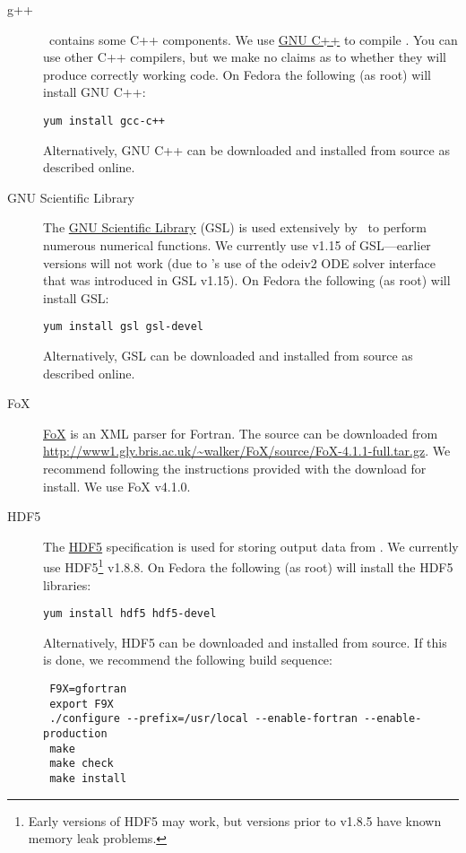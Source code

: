 \begin{description}
\item [g++] \glc\ contains some C++ components. We use \href{http://gcc.gnu.org/projects/cxx0x.html}{GNU C++} to compile \glc. You can use other C++ compilers, but we make no claims as to whether they will produce correctly working code. On Fedora the following (as root) will install GNU C++:
\begin{verbatim}
yum install gcc-c++
\end{verbatim}
Alternatively, GNU C++ can be downloaded and installed from source as described online.

\item [GNU Scientific Library] The \href{http://www.gnu.org/software/gsl/}{GNU Scientific Library} (GSL) is used extensively by \glc\ to perform numerous numerical functions. We currently use v1.15 of GSL---earlier versions will not work (due to \glc's use of the {\normalfont \ttfamily odeiv2} ODE solver interface that was introduced in GSL v1.15). On Fedora the following (as root) will install GSL:
\begin{verbatim}
yum install gsl gsl-devel
\end{verbatim}
Alternatively, GSL can be downloaded and installed from source as described online.

\item [FoX] \href{http://uszla.me.uk/space/software/FoX/}{FoX} is an XML parser for Fortran. The source can be downloaded from \newline\href{http://www1.gly.bris.ac.uk/~walker/FoX/source/FoX-4.1.1-full.tar.gz}{\normalfont \ttfamily http://www1.gly.bris.ac.uk/\textasciitilde{}walker/FoX/source/FoX-4.1.1-full.tar.gz}. We recommend following the instructions provided with the download for install. We use FoX v4.1.0.

\item [HDF5] The \href{http://www.hdfgroup.org/HDF5/}{HDF5} specification is used for storing output data from \glc. We currently use HDF5\footnote{Early versions of HDF5 may work, but versions prior to v1.8.5 have known memory leak problems.} v1.8.8. On Fedora the following (as root) will install the HDF5 libraries:
\begin{verbatim}
yum install hdf5 hdf5-devel
\end{verbatim}
Alternatively, HDF5 can be downloaded and installed from source. If this is done, we recommend the following build sequence:
\begin{verbatim}
 F9X=gfortran
 export F9X
 ./configure --prefix=/usr/local --enable-fortran --enable-production
 make
 make check
 make install
\end{verbatim}


\end{description}
